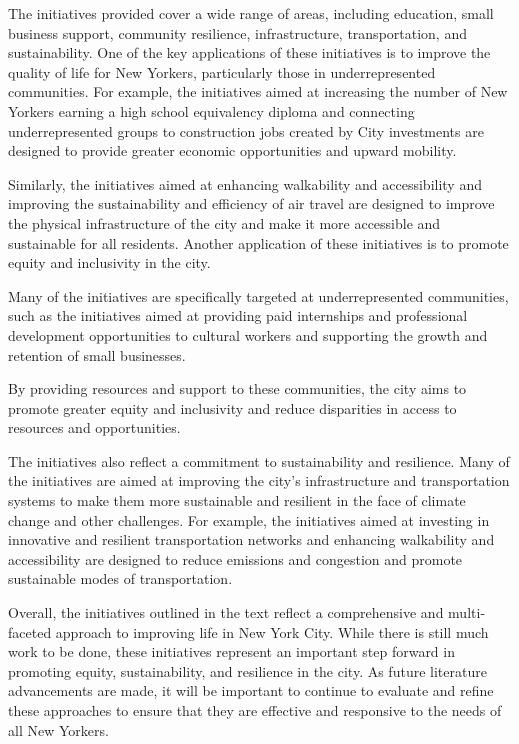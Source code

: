 \documentclass[
  letterpaper,
  DIV=11,
  numbers=noendperiod]{scrreprt}
\begin{document}
The initiatives provided cover a wide range of areas, including
education, small business support, community resilience, infrastructure,
transportation, and sustainability. One of the key applications of these
initiatives is to improve the quality of life for New Yorkers,
particularly those in underrepresented communities. For example, the
initiatives aimed at increasing the number of New Yorkers earning a high
school equivalency diploma and connecting underrepresented groups to
construction jobs created by City investments are designed to provide
greater economic opportunities and upward mobility.

Similarly, the initiatives aimed at enhancing walkability and
accessibility and improving the sustainability and efficiency of air
travel are designed to improve the physical infrastructure of the city
and make it more accessible and sustainable for all residents. Another
application of these initiatives is to promote equity and inclusivity in
the city.

Many of the initiatives are specifically targeted at underrepresented
communities, such as the initiatives aimed at providing paid internships
and professional development opportunities to cultural workers and
supporting the growth and retention of small businesses.

By providing resources and support to these communities, the city aims
to promote greater equity and inclusivity and reduce disparities in
access to resources and opportunities.

The initiatives also reflect a commitment to sustainability and
resilience. Many of the initiatives are aimed at improving the city's
infrastructure and transportation systems to make them more sustainable
and resilient in the face of climate change and other challenges. For
example, the initiatives aimed at investing in innovative and resilient
transportation networks and enhancing walkability and accessibility are
designed to reduce emissions and congestion and promote sustainable
modes of transportation.

Overall, the initiatives outlined in the text reflect a comprehensive
and multi-faceted approach to improving life in New York City. While
there is still much work to be done, these initiatives represent an
important step forward in promoting equity, sustainability, and
resilience in the city. As future literature advancements are made, it
will be important to continue to evaluate and refine these approaches to
ensure that they are effective and responsive to the needs of all New
Yorkers.
\end{document}

